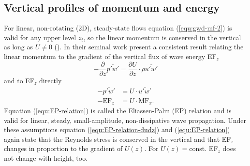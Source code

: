 \subsection*{Vertical profiles of momentum and energy}
For linear, non-rotating (2D), steady-state flows equation (\ref{equ:gwd-mf-2}) is valid for any upper level $z_t$, so the linear momentum is conserved in the vertical as long as $U \neq 0$ (\cite[]{durran_lee_2003}). In their seminal work \textcite[]{eliassen_transfer_1960} present a consistent result relating the linear momentum to the gradient of the vertical flux of wave energy EF$_z$
\begin{equation}
    -\frac{\partial}{\partial z}\overbar{p'w'} = \frac{\partial U}{\partial z} \cdot \bar{\rho} \overbar{u'w'}
    \label{equ:EP-relation-dudz}
\end{equation}
and to EF$_z$ directly
\begin{equation}
    \begin{aligned}
    -\overbar{p'w'}& = U \cdot \overbar{u'w'} \\
    -\mathrm{EF}_z& = U \cdot \mathrm{MF}_x.
    \end{aligned}
    \label{equ:EP-relation}
\end{equation}
Equation (\ref{equ:EP-relation}) is called the Eliassen-Palm (EP) relation and is valid for linear, steady, small-amplitude, non-dissipative wave propagation. Under these assumptions equation (\ref{equ:EP-relation-dudz}) and (\ref{equ:EP-relation}) again state that the Reynolds stress is conserved in the vertical and that EF$_z$ changes in proportion to the gradient of $U(z)$. For $U(z)=$const. EF$_z$ does not change with height, too.

